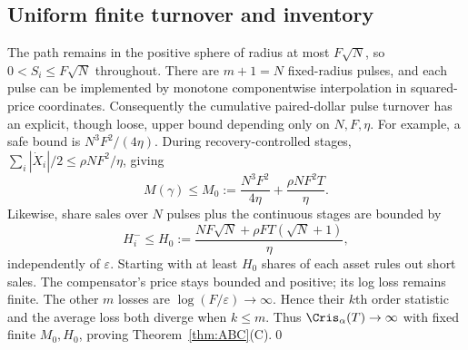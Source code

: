\documentclass[review,hidelinks,onefignum,onetabnum]{siamonline250211}
\begin{document}
\subsection{Uniform finite turnover and inventory}
The path remains in the positive sphere of radius at most $F\sqrt N$, so $0<S_i\le F\sqrt N$ throughout. There are $m+1=N$ fixed-radius pulses, and each pulse can be implemented by monotone componentwise interpolation in squared-price coordinates. Consequently the cumulative paired-dollar pulse turnover has an explicit, though loose, upper bound depending only on $N,F,\eta$. For example, a safe bound is $N^3F^2/(4\eta)$. During recovery-controlled stages, $\sum_i|\dot X_i|/2\le \rho NF^2/\eta$, giving
\begin{equation}\label{eq:uniformM}
M(\gamma)\le M_0:=\frac{N^3F^2}{4\eta}+\frac{\rho NF^2T}{\eta}.
\end{equation}
Likewise, share sales over $N$ pulses plus the continuous stages are bounded by
\begin{equation}\label{eq:uniformH}
H_i^-\le H_0:=\frac{NF\sqrt N+\rho FT(\sqrt N+1)}\eta,
\end{equation}
independently of $\varepsilon$. Starting with at least $H_0$ shares of each asset rules out short sales. The compensator's price stays bounded and positive; its log loss remains finite. The other $m$ losses are $\log(F/\varepsilon)\to\infty$. Hence their $k$th order statistic and the average loss both diverge when $k\le m$. Thus $\Cris_\alpha(T)\to\infty$ with fixed finite $M_0,H_0$, proving Theorem~\ref{thm:ABC}(C).\qed
\end{document}
